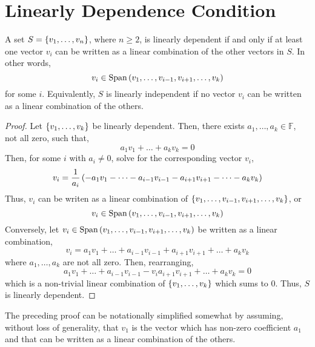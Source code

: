 \documentclass[letterpaper,12pt]{article}
\begin{document}
\section*{Linearly Dependence Condition}
\begin{theorem}
A set $S = \left\{ v_1, \dots, v_n \right\}$, where $n \geq 2$, is linearly dependent if and only if at least one vector $v_i$ can be written as a linear combination of the other vectors in $S$. In other words,
\begin{equation*}
    v_i \in \text{Span}\left(v_1, \dots, v_{i-1}, v_{i+1}, \dots, v_k \right)
\end{equation*}
for some $i$. Equivalently, $S$ is linearly independent if no vector $v_i$ can be written as a linear combination of the others.
\end{theorem}

\begin{proof}
Let $\left\{ v_1, \dots, v_k \right\}$ be linearly dependent. Then, there exists $a_1, \dots, a_k \in \mathbb{F}$, not all zero, such that,
\begin{equation*}
    a_1 v_1 + \dots + a_k v_k = 0
\end{equation*}
Then, for some $i$ with $a_i \neq 0$, solve for the corresponding vector $v_i$,
\begin{equation*}
    v_i = \frac{1}{a_i}\left( -a_1 v_1 - \dots - a_{i-1} v_{i-1} - a_{i+1} v_{i+1} - \dots - a_k v_k \right)
\end{equation*}
Thus, $v_i$ can be writen as a linear combination of $\left\{ v_1, \dots, v_{i-1}, v_{i+1}, \dots, v_k \right\}$, or
\begin{equation*}
    v_i \in \text{Span}\left(v_1, \dots, v_{i-1}, v_{i+1}, \dots, v_k \right)
\end{equation*}
Conversely, let $v_i \in \text{Span}\left(v_1, \dots, v_{i-1}, v_{i+1}, \dots, v_k \right)$ be written as a linear combination,
\begin{equation*}
    v_i = a_1 v_1 + \dots + a_{i-1} v_{i-1} + a_{i+1} v_{i+1} + \dots + a_k v_k
\end{equation*}
where $a_1, \dots, a_k$ are not all zero. Then, rearranging,
\begin{equation*}
    a_1 v_1 + \dots + a_{i-1} v_{i-1} - v_i a_{i+1} v_{i+1} + \dots + a_k v_k = 0
\end{equation*}
which is a non-trivial linear combination of $\left\{ v_1, \dots, v_k \right\}$ which sums to 0. Thus, $S$ is linearly dependent.
\end{proof}

The preceding proof can be notationally simplified somewhat by assuming, without loss of generality, that $v_1$ is the vector which has non-zero coefficient $a_1$ and that can be written as a linear combination of the others.
\end{document}

